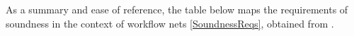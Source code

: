 As a summary and ease of reference, the table below maps the requirements of soundness in the context of workflow nets \ref{SoundnessReqs}, obtained from \cite{Ramirez2024}.

